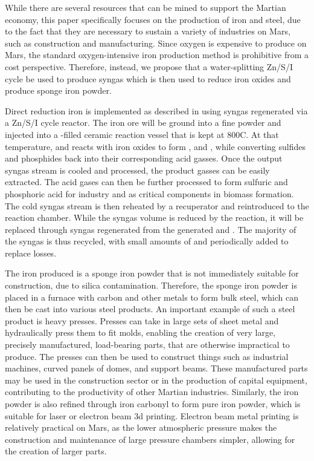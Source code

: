 \documentclass[fleqn,10pt]{Stylesheet} %
\begin{document}
While there are several resources that can be mined to support the Martian economy, this paper specifically focuses on the production of iron and steel, due to the fact that they are necessary to sustain a variety of industries on Mars, such as construction and manufacturing. Since oxygen is expensive to produce on Mars, the standard oxygen-intensive iron production method  is prohibitive from a cost perspective. Therefore, instead, we propose that a water-splitting  Zn/S/I cycle be used to produce syngas which is then used to reduce iron oxides and produce sponge iron powder.

Direct reduction iron is implemented as described in \cite{ZhangTao2014} using syngas regenerated via a Zn/S/I cycle reactor. The iron ore will be ground into a fine powder and injected into a -filled ceramic reaction vessel that is kept at 800\degree{}C. At that temperature,  and  reacts with iron oxides to form ,  and , while converting sulfides and phosphides back into their corresponding acid gasses. Once the output syngas stream is cooled and processed, the product gasses can be easily extracted. The acid gases can then be further processed to form sulfuric and phosphoric acid for industry and as critical components in biomass formation. The cold syngas stream is then reheated by a recuperator and reintroduced to the reaction chamber. While the syngas volume is reduced by the reaction, it will be replaced through syngas regenerated from the generated  and . The majority of the syngas is thus recycled, with small amounts of  and  periodically added to replace losses.

The iron produced is a sponge iron powder that is not immediately suitable for construction, due to silica contamination. Therefore, the sponge iron powder is placed in a furnace with carbon and other metals to form bulk steel, which can then be cast into various steel products. An important example of such a steel product is heavy presses. Presses can take in large sets of sheet metal and hydraulically press them to fit molds, enabling the creation of very large, precisely manufactured, load-bearing parts, that are otherwise impractical to produce. The presses can then be used to construct things such as industrial machines, curved panels of domes, and support beams. These manufactured parts may be used in the construction sector or in the production of capital equipment, contributing to the productivity of other Martian industries. Similarly, the iron powder is also refined through iron carbonyl \cite{2011Zubrin} to form pure iron powder, which is suitable for laser or electron beam 3d printing. Electron beam metal printing is relatively practical on Mars, as the lower atmospheric pressure makes the construction and maintenance of large pressure chambers simpler, allowing for the creation of larger parts.
\end{document}

